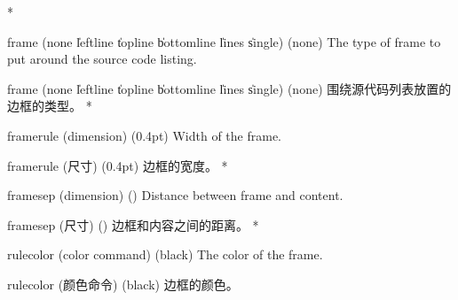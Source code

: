 \begin{optionlist}
\begin{paracol}{2}
\switchcolumn[0]*%
\item[frame (none \| leftline \| topline \| bottomline \| lines \| single) (none)]
The type of frame to put around the source code listing.
\switchcolumn
\item[frame (none \| leftline \| topline \| bottomline \| lines \| single) (none)]
围绕源代码列表放置的边框的类型。
\switchcolumn[0]*%
\item[framerule (dimension) (0.4pt)]
Width of the frame.
\switchcolumn
\item[framerule (尺寸) (0.4pt)]
边框的宽度。
\switchcolumn[0]*%
\item[framesep (dimension) (\cmd\fboxsep)]
Distance between frame and content.
\switchcolumn
\item[framesep (尺寸) (\cmd\fboxsep)]
边框和内容之间的距离。
\switchcolumn[0]*%
\item[rulecolor (color command) (black)]
The color of the frame.
\switchcolumn
\item[rulecolor (颜色命令) (black)]
边框的颜色。
\end{paracol}
\end{optionlist}
